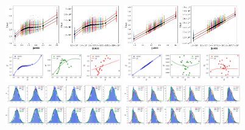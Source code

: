 \documentclass[prd,aps,twocolumn,a4paper,showkeys,nofootinbib]{revtex4-1}
\begin{document}
\begin{figure}[t]
	\includegraphics[width=0.45\textwidth]{./FigsErr/v1_BNS_rec_m1_bins.png}
	\hspace{0.8cm}
	\includegraphics[width=0.45\textwidth]{./FigsErr/v1_BNS_pred_m1_bins.png} \\
	
	\includegraphics[width=0.45\textwidth]{./FigsErr/v1_BNS_rec_m1_fits.png}
	\hspace{0.8cm}
	\includegraphics[width=0.45\textwidth]{./FigsErr/v1_BNS_pred_m1_fits.png} \\
	
	\includegraphics[width=0.45\textwidth]{./FigsErr/v1_BNS_rec_m1_distr1.png}
	\hspace{0.8cm}
	\includegraphics[width=0.45\textwidth]{./FigsErr/v1_BNS_pred_m1_distr1.png} \\
	
	\includegraphics[width=0.45\textwidth]{./FigsErr/v1_BNS_rec_m1_distr2.png}
	\hspace{0.8cm}
	\includegraphics[width=0.45\textwidth]{./FigsErr/v1_BNS_pred_m1_distr2.png} \\
	

\end{figure}
\end{document}
